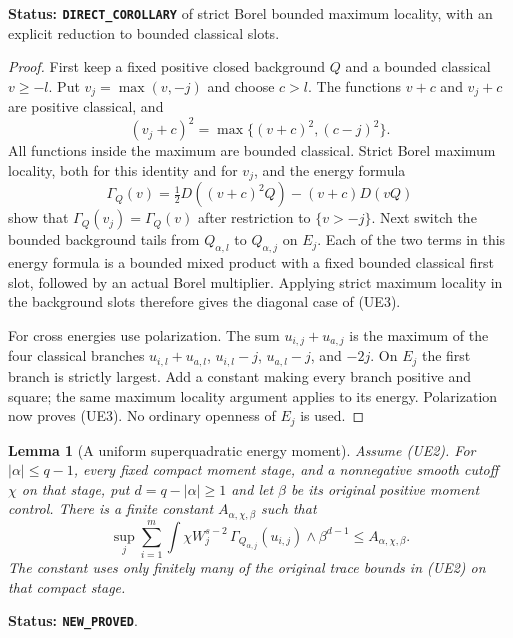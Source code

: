 \documentclass[11pt,a4paper]{article}
\numberwithin{equation}{section}
\newtheorem{lemma}[theorem]{Lemma}
\theoremstyle{definition}
\theoremstyle{remark}
\begin{document}
\noindent\textbf{Status: \texttt{DIRECT\_COROLLARY}} of strict
Borel bounded maximum locality, with an explicit reduction to bounded
classical slots.

\begin{proof}
First keep a fixed positive closed background $Q$ and a bounded
classical $v\geq-l$.  Put $v_j=\max(v,-j)$ and choose $c>l$.
The functions $v+c$ and $v_j+c$ are positive classical, and
\[
 (v_j+c)^2=\max\{(v+c)^2,(c-j)^2\}.
\]
All functions inside the maximum are bounded classical.  Strict
Borel maximum locality, both for this identity and for $v_j$, and
the energy formula
\[
 \Gamma_Q(v)=\tfrac12D((v+c)^2Q)-(v+c)D(vQ)
\]
show that $\Gamma_Q(v_j)=\Gamma_Q(v)$ after restriction to
$\{v>-j\}$.  Next switch the bounded background tails from
$Q_{\alpha,l}$ to $Q_{\alpha,j}$ on $E_j$.  Each of the two terms
in this energy formula is a bounded mixed product with a fixed
bounded classical first slot, followed by an actual Borel multiplier.
Applying strict maximum locality in the background slots therefore
gives the diagonal case of (UE3).

For cross energies use polarization.  The sum
$u_{i,j}+u_{a,j}$ is the maximum of the four classical branches
$u_{i,l}+u_{a,l}$, $u_{i,l}-j$, $u_{a,l}-j$, and $-2j$.
On $E_j$ the first branch is strictly largest.  Add a constant
making every branch positive and square; the same maximum locality
argument applies to its energy.  Polarization now proves (UE3).
No ordinary openness of $E_j$ is used.
\end{proof}

\begin{lemma}[A uniform superquadratic energy moment]
\label{lem:r11-superquadratic-energy-moment}
Assume (UE2).  For $|\alpha|\leq q-1$, every fixed compact moment
stage, and a nonnegative smooth cutoff $\chi$ on that stage, put
$d=q-|\alpha|\geq1$ and let $\beta$ be its original positive
moment control.  There is a finite constant $A_{\alpha,\chi,\beta}$
such that
\[
 \sup_j\sum_{i=1}^m
  \int\chi W_j^{s-2}\,
       \Gamma_{Q_{\alpha,j}}(u_{i,j})\wedge\beta^{d-1}
                         \leq A_{\alpha,\chi,\beta}.
 \tag{UE4}
\]
The constant uses only finitely many of the original trace bounds
in (UE2) on that compact stage.
\end{lemma}

\noindent\textbf{Status: \texttt{NEW\_PROVED}}.
\end{document}
